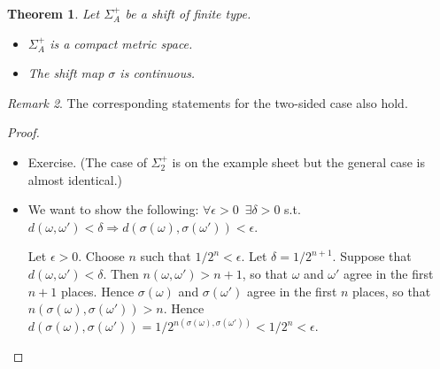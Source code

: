 \documentclass[12pt]{article}
\newtheorem{theorem}{Theorem}[section]
\theoremstyle{definition}
\theoremstyle{remark}
\newtheorem{remark}[theorem]{Remark}
\begin{document}
\begin{theorem}
Let $\Sigma_{A}^{+}$ be a shift of finite type.
\begin{itemize}
\item[(i)]
$\Sigma_{A}^{+}$ is a compact metric space.
\item[(ii)]
The  shift map $\sigma$ is continuous.
\end{itemize}
\end{theorem}
\begin{remark}
The corresponding statements for the two-sided case also hold.
\end{remark}
\begin{proof}
\begin{itemize}
\item[(i)] 
Exercise. (The case of $\Sigma_2^+$ is on the example sheet but the general case is 
almost identical.)




\item[(ii)]
We want to show the following: $\forall \epsilon > 0$\ $\exists \delta>0$
s.t.\ $d(\omega,\omega') < \delta \Rightarrow d(\sigma(\omega),\sigma(\omega'))< \epsilon$.

Let $\epsilon>0$.  Choose $n$ such that $1/2^{n} < \epsilon$.  Let $\delta =
1/2^{n+1}$.  Suppose that $d(\omega,\omega') < \delta$.  Then $n(\omega,\omega') > n+1$, so
that $\omega$ and $\omega'$ agree in the first $n+1$ places.  Hence $\sigma(\omega)$
and $\sigma(\omega')$ agree in the first $n$ places, so that $n(\sigma(\omega),
\sigma(\omega')) > n$.  Hence $d(\sigma(\omega),\sigma(\omega'))=
1/2^{n(\sigma(\omega),\sigma(\omega'))} < 1/2^{n} < \epsilon$.  
\end{itemize}
\end{proof}
\end{document}
